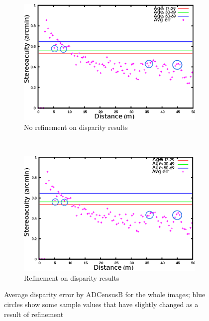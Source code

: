 \begin{figure}[H]
\centering
\begin{subfigure}{\linewidth}
\centering
\includegraphics[scale=0.95]{adcenfull3NoLRmrk}
\caption{No refinement on disparity results}
\label{fig:adcfnoLR}
\vspace{2mm}
\end{subfigure} \\
\begin{subfigure}{\linewidth}
\centering
\includegraphics[scale=0.95]{adcenfull3mrk}
\caption{Refinement on disparity results}
\label{fig:adcf3mrk}
\end{subfigure}
\caption{Average disparity error by ADCensusB for the whole images; blue circles show some sample values that have slightly changed as a result of refinement}
\label{fig:adcFLRnoLR}
\end{figure} 

